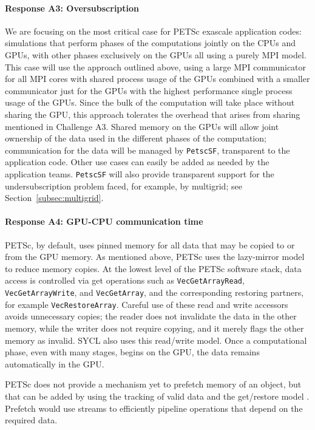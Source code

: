 \documentclass[5p,times]{elsarticle}
\begin{document}
\paragraph{Response A3: Oversubscription}

We are focusing on the most critical case for PETSc exascale application codes: simulations that perform phases of the computations jointly on the CPUs and GPUs, with other phases exclusively on the
GPUs all using a purely MPI model. This case will use the approach outlined above, using a large MPI communicator for all MPI cores with shared process usage of the GPUs
combined with a smaller communicator just for the GPUs with the highest performance single process usage of the GPUs. Since the bulk of the computation 
will take place without sharing the GPU, this approach tolerates the overhead that arises from sharing mentioned in Challenge A3. Shared memory on the 
GPUs will allow joint ownership of the data used in the different phases of the computation; communication for the data will be managed by {\tt PetscSF}, transparent to the application code. 
Other use cases can easily be added as needed by the application teams. {\tt PetscSF} will also provide transparent support for the undersubscription problem faced, for example, by multigrid; see Section~\ref{subsec:multigrid}. 


\paragraph{Response A4: GPU-CPU communication time} 

PETSc, by default, uses pinned memory for all data that may be copied to or from the GPU memory. As mentioned above, PETSc uses the lazy-mirror model to reduce memory copies.
At the lowest level of the PETSc software stack, data access is controlled via get operations such as {\tt VecGetArrayRead}, {\tt VecGetArrayWrite}, and {\tt VecGetArray}, and the
corresponding restoring partners, for example {\tt VecRestoreArray}. Careful use of these read and write accessors avoids unnecessary copies; the reader does not invalidate the data in the other memory, while the writer does not require copying, and it merely flags the other memory as invalid. SYCL also uses this read/write model. Once a computational phase, even with many stages, begins on the GPU, the data remains automatically in the GPU.

PETSc does not provide a mechanism yet to prefetch memory of an object, but that can be added by using the tracking of valid data and the get/restore model \cite{bkmms2012}.
Prefetch would use streams to efficiently pipeline operations that depend on the required data.
\end{document}
